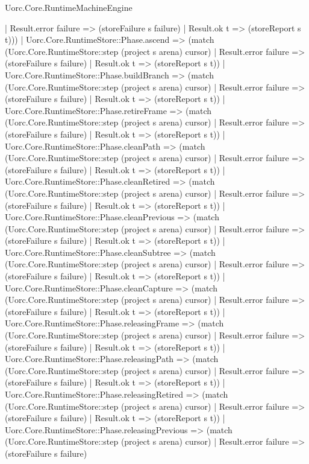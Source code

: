 \begin{lexlean}{Uorc.Core.RuntimeMachineEngine}
\begin{semanticmodule}
{      | Result.error failure => (storeFailure s failure)
      | Result.ok t => (storeReport s t)))
    | Uorc.Core.RuntimeStore::Phase.ascend => (match (Uorc.Core.RuntimeStore::step (project s arena) cursor)
      | Result.error failure => (storeFailure s failure)
      | Result.ok t => (storeReport s t))
    | Uorc.Core.RuntimeStore::Phase.buildBranch => (match (Uorc.Core.RuntimeStore::step (project s arena) cursor)
      | Result.error failure => (storeFailure s failure)
      | Result.ok t => (storeReport s t))
    | Uorc.Core.RuntimeStore::Phase.retireFrame => (match (Uorc.Core.RuntimeStore::step (project s arena) cursor)
      | Result.error failure => (storeFailure s failure)
      | Result.ok t => (storeReport s t))
    | Uorc.Core.RuntimeStore::Phase.cleanPath => (match (Uorc.Core.RuntimeStore::step (project s arena) cursor)
      | Result.error failure => (storeFailure s failure)
      | Result.ok t => (storeReport s t))
    | Uorc.Core.RuntimeStore::Phase.cleanRetired => (match (Uorc.Core.RuntimeStore::step (project s arena) cursor)
      | Result.error failure => (storeFailure s failure)
      | Result.ok t => (storeReport s t))
    | Uorc.Core.RuntimeStore::Phase.cleanPrevious => (match (Uorc.Core.RuntimeStore::step (project s arena) cursor)
      | Result.error failure => (storeFailure s failure)
      | Result.ok t => (storeReport s t))
    | Uorc.Core.RuntimeStore::Phase.cleanSubtree => (match (Uorc.Core.RuntimeStore::step (project s arena) cursor)
      | Result.error failure => (storeFailure s failure)
      | Result.ok t => (storeReport s t))
    | Uorc.Core.RuntimeStore::Phase.cleanCapture => (match (Uorc.Core.RuntimeStore::step (project s arena) cursor)
      | Result.error failure => (storeFailure s failure)
      | Result.ok t => (storeReport s t))
    | Uorc.Core.RuntimeStore::Phase.releasingFrame => (match (Uorc.Core.RuntimeStore::step (project s arena) cursor)
      | Result.error failure => (storeFailure s failure)
      | Result.ok t => (storeReport s t))
    | Uorc.Core.RuntimeStore::Phase.releasingPath => (match (Uorc.Core.RuntimeStore::step (project s arena) cursor)
      | Result.error failure => (storeFailure s failure)
      | Result.ok t => (storeReport s t))
    | Uorc.Core.RuntimeStore::Phase.releasingRetired => (match (Uorc.Core.RuntimeStore::step (project s arena) cursor)
      | Result.error failure => (storeFailure s failure)
      | Result.ok t => (storeReport s t))
    | Uorc.Core.RuntimeStore::Phase.releasingPrevious => (match (Uorc.Core.RuntimeStore::step (project s arena) cursor)
      | Result.error failure => (storeFailure s failure)
}
\end{semanticmodule}
\end{lexlean}
